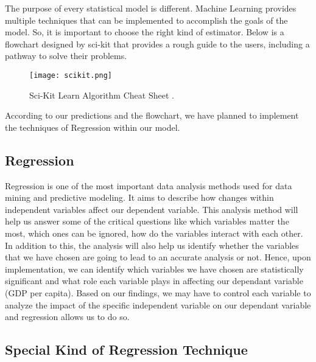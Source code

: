 \hspace{20pt}The purpose of every statistical model is different. Machine Learning provides multiple techniques that can be implemented to accomplish the goals of the model. So, it is important to choose the right kind of estimator. Below is a flowchart designed by sci-kit that provides a rough guide to the users, including a pathway to solve their problems.

\begin{figure}[htpb]
\centering
\texttt{[image: scikit.png]}
\caption{
        Sci-Kit Learn Algorithm Cheat Sheet \cite{scikit-learn}. 
    }
    \label{fig:basics AFM sketch}
\end{figure}

According to our predictions and the flowchart, we have planned to implement the techniques of Regression within our model.

\subsection{Regression}

\hspace{20pt}Regression is one of the most important data analysis methods used for data mining and predictive modeling. It aims to describe how changes within independent variables affect our dependent variable. This analysis method will help us answer some of the critical questions like which variables matter the most, which ones can be ignored, how do the variables interact with each other. In addition to this, the analysis will also help us identify whether the variables that we have chosen are going to lead to an accurate analysis or not. Hence, upon implementation, we can identify which variables we have chosen are statistically significant and what role each variable plays in affecting our dependant variable (GDP per capita). Based on our findings, we may have to control each variable to analyze the impact of the specific independent variable on our dependant variable and regression allows us to do so.

\subsection{Special Kind of Regression Technique}

